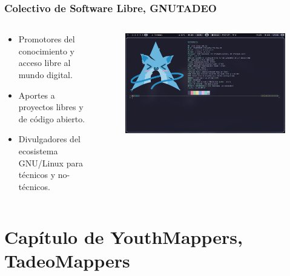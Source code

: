 \documentclass[17pt, t, lualatex]{beamer}
\begin{document}
\begin{frame}
  \frametitle{Colectivo de Software Libre, GNUTADEO}

  \begin{columns}
    \begin{column}{.5\textwidth}
      \begin{itemize}
        \item Promotores del conocimiento y acceso libre al mundo digital.
        \item Aportes a proyectos libres y de código abierto.
        \item Divulgadores del ecosistema GNU/Linux para técnicos y no-técnicos.
      \end{itemize}
    \end{column}

    \begin{column}{.5\textwidth}
      \begin{figure}
        \centering
        \includegraphics[width=1\textwidth]{img/Arch.png}
      \end{figure}
    \end{column}
  \end{columns}
\end{frame}


\section{Capítulo de YouthMappers, TadeoMappers}

\insertsectionpage
\end{document}
